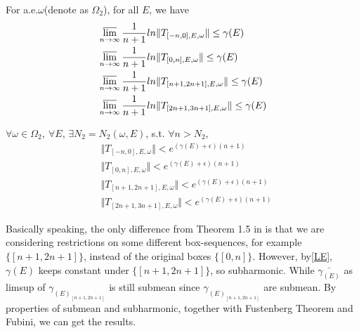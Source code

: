 \begin{thm}
  For a.e.$\omega$(denote as $\Omega_2$), for all $E$, we have
  \[
    \begin{aligned}
      &\varlimsup_{n\to\infty} \frac{1}{n+1} ln\Vert T_{[-n,0],E,\omega}\Vert\leq\gamma(E)\\
      &\varlimsup_{n\to\infty} \frac{1}{n+1} ln\Vert T_{[0,n],E,\omega}\Vert\leq\gamma(E)\\
      &\varlimsup_{n\to\infty} \frac{1}{n+1} ln\Vert T_{[n+1,2n+1],E,\omega}\Vert\leq\gamma(E)\\
      &\varlimsup_{n\to\infty} \frac{1}{n+1} ln\Vert T_{[2n+1,3n+1],E,\omega}\Vert\leq\gamma(E)
    \end{aligned}
  \]
\end{thm}
\begin{cor}\label{omega2}
  $\forall \omega\in\Omega_2,~\forall E$, $\exists N_2=N_2(\omega,E)$, s.t. $\forall n>N_2$,
  \[
    \begin{aligned}
      &\Vert T_{[-n,0],E,\omega}\Vert< e^{(\gamma(E)+\epsilon)(n+1)}\\
      &\Vert T_{[0,n],E,\omega}\Vert< e^{(\gamma(E)+\epsilon)(n+1)}\\
      &\Vert T_{[n+1,2n+1],E,\omega}\Vert< e^{(\gamma(E)+\epsilon)(n+1)}\\
      &\Vert T_{[2n+1,3n+1],E,\omega}\Vert< e^{(\gamma(E)+\epsilon)(n+1)}
    \end{aligned}
  \]
\end{cor}
\begin{remark}
  Basically speaking, the only difference from Theorem 1.5 in \cite{craig1983subharmonicity} is that we are considering restrictions on some different box-sequences, for example $\{[n+1,2n+1]\}$, instead of the original boxes $\{[0,n]\}$. However, by\ref{LE}, $\gamma(E)$ keeps constant under $\{[n+1,2n+1]\}$, so subharmonic. While $\bar{\gamma_(E)}$ as limsup of $\gamma_(E)_[n+1,2n+1]$ is still submean since $\gamma_(E)_[n+1,2n+1]$ are submean. By properties of submean and subharmonic, together with Fustenberg Theorem and Fubini, we can get the results.
\end{remark}
